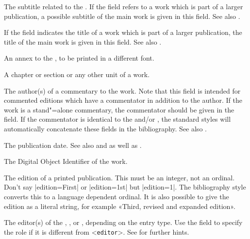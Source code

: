 \documentclass{ltxdockit}[2011/03/25]
\begin{document}
\begin{fieldlist}

The subtitle related to the . If the  field refers to a work which is part of a larger publication, a possible subtitle of the main work is given in this field. See also .


If the  field indicates the title of a work which is part of a larger publication, the title of the main work is given in this field. See also .


An annex to the , to be printed in a different font.


A chapter or section or any other unit of a work.


The author(s) of a commentary to the work. Note that this field is intended for commented editions which have a commentator in addition to the author. If the work is a stand"=alone commentary, the commentator should be given in the  field. If the commentator is identical to the  and\slash or , the standard styles will automatically concatenate these fields in the bibliography. See also .


The publication date. See also  and  as well as .


The Digital Object Identifier of the work.


The edition of a printed publication. This must be an integer, not an ordinal. Don't say |edition={First}| or |edition={1st}| but |edition={1}|. The bibliography style converts this to a language dependent ordinal. It is also possible to give the edition as a literal string, for example «Third, revised and expanded edition».


The editor(s) of the , , or , depending on the entry type. Use the  field to specify the role if it is different from <\texttt{editor}>. See  for further hints.


\end{fieldlist}
\end{document}
